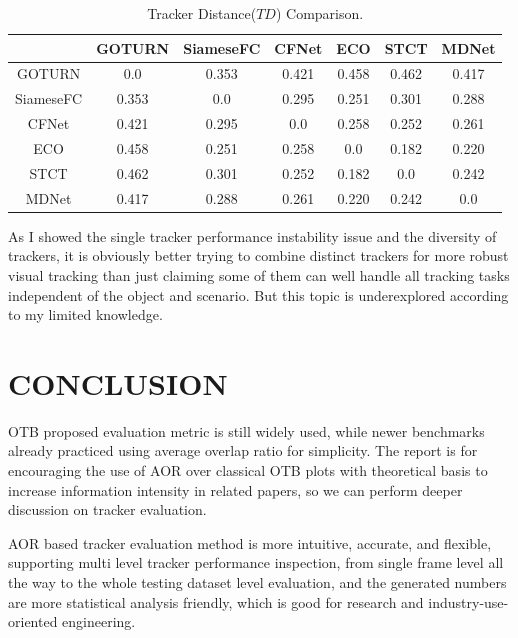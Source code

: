 \documentclass{article}
\begin{document}
\begin{table}[htbp]%
  \centering
  \caption{Tracker Distance($TD$) Comparison.}

    \begin{tabular}{ccccccc}
    \toprule
    &GOTURN&SiameseFC&CFNet&ECO&STCT&MDNet\\
    \midrule
    GOTURN& 0.0&  0.353&  0.421&  0.458&  0.462&  0.417\\
    \midrule
    SiameseFC& 0.353&  0.0&  0.295&  0.251&  0.301&  0.288\\
    \midrule
    CFNet& 0.421&  0.295&  0.0&  0.258&  0.252&  0.261\\
    \midrule
    ECO& 0.458&  0.251&  0.258&  0.0&  0.182&  0.220\\
    \midrule
    STCT& 0.462&  0.301&  0.252&  0.182&  0.0&  0.242\\
    \midrule
    MDNet& 0.417&  0.288&  0.261&  0.220&  0.242&  0.0\\
    \bottomrule
    \end{tabular}%
  \label{tab:trackerdist}%
\end{table}%

As I showed the single tracker performance instability issue and the diversity of trackers, it is obviously better trying to combine distinct trackers for more robust visual tracking than just claiming some of them can well handle all tracking tasks independent of the object and scenario. But this topic is underexplored according to my limited knowledge.




\section{CONCLUSION}
\label{sec:conclusion}

OTB\cite{otb} proposed evaluation metric is still widely used, while newer benchmarks already practiced using average overlap ratio for simplicity. The report is for encouraging the use of AOR over classical OTB\cite{otb} plots with theoretical basis to increase information intensity in related papers, so we can perform deeper discussion on tracker evaluation.


AOR based tracker evaluation method is more intuitive, accurate, and flexible, supporting multi level tracker performance inspection, from single frame level all the way to the whole testing dataset level evaluation, and the generated numbers are more statistical analysis friendly, which is good for research and industry-use-oriented engineering.
\end{document}
